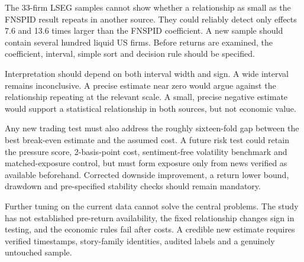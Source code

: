 The 33-firm LSEG samples cannot show whether a relationship as small as the
FNSPID result repeats in another source. They could reliably detect only effects
7.6 and 13.6 times larger than the FNSPID coefficient. A new sample should
contain several hundred liquid US firms. Before returns are examined, the
coefficient, interval, simple sort and decision rule should be specified.

Interpretation should depend on both interval width and sign. A wide interval
remains inconclusive. A precise estimate near zero would argue against
the relationship repeating at the relevant scale. A small, precise negative
estimate would support a statistical relationship in both sources, but not
economic value.

Any new trading test must also address the roughly sixteen-fold gap between the
best break-even estimate and the assumed cost. A future risk test could retain
the pressure score, 2-basis-point cost, sentiment-free volatility benchmark and
matched-exposure control, but must form exposure only from news verified as
available beforehand. Corrected downside improvement, a return lower bound,
drawdown and pre-specified stability checks should remain mandatory.

Further tuning on the current data cannot solve the central problems. The study
has not established pre-return availability, the fixed relationship changes sign
in testing, and the economic rules fail after costs. A credible new estimate
requires verified timestamps, story-family identities, audited labels and a
genuinely untouched sample.
